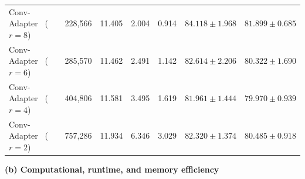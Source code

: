 \documentclass[pdflatex,sn-mathphys-num]{sn-jnl}
\theoremstyle{thmstyleone}
\theoremstyle{thmstyletwo}
\theoremstyle{thmstylethree}
\begin{document}
\begin{table}[!t]
{\begin{tabular}{@{}lrrrrrr@{}}
Conv-Adapter~\cite{chen2024convadapter} ($r=8$) & 228,566 & 11.405 & 2.004 & 0.914 & $84.118\pm1.968$ & $81.899\pm0.685$ \\
Conv-Adapter~\cite{chen2024convadapter} ($r=6$) & 285,570 & 11.462 & 2.491 & 1.142 & $82.614\pm2.206$ & $80.322\pm1.690$ \\
Conv-Adapter~\cite{chen2024convadapter} ($r=4$) & 404,806 & 11.581 & 3.495 & 1.619 & $81.961\pm1.444$ & $79.970\pm0.939$ \\
Conv-Adapter~\cite{chen2024convadapter} ($r=2$) & 757,286 & 11.934 & 6.346 & 3.029 & $82.320\pm1.374$ & $80.485\pm0.918$ \\
\bottomrule
\end{tabular}%
}

\vspace{5pt}
\textbf{(b) Computational, runtime, and memory efficiency}


\end{table}
\end{document}
